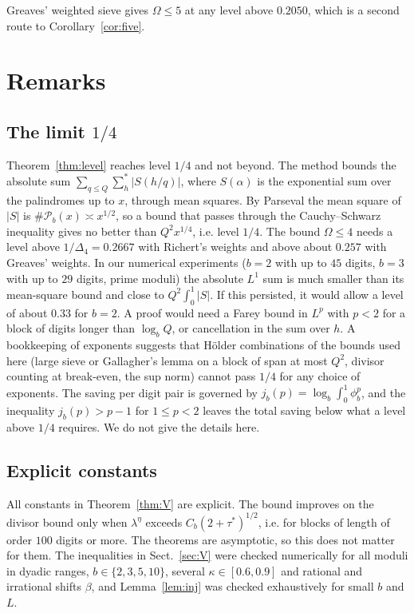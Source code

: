 \documentclass[11pt]{amsart}
\theoremstyle{definition}
\numberwithin{equation}{section}
\newcommand{\PP}{\mathscr{P}}
\begin{document}
Greaves' weighted sieve \cite{Gr82} gives $\Omega\le5$ at any level above $0.2050$, which is a second route to Corollary~\ref{cor:five}.

\section{Remarks}\label{sec:remarks}

\subsection{The limit $1/4$}
Theorem~\ref{thm:level} reaches level $1/4$ and not beyond. The method bounds the absolute sum $\sum_{q\le Q}\sum^*_h|S(h/q)|$, where $S(\alpha)$ is the exponential sum over the palindromes up to $x$, through mean squares. By Parseval the mean square of $|S|$ is $\#\PP_b(x)\asymp x^{1/2}$, so a bound that passes through the Cauchy--Schwarz inequality gives no better than $Q^2x^{1/4}$, i.e. level $1/4$. The bound $\Omega\le4$ needs a level above $1/\Delta_4=0.2667$ with Richert's weights and above about $0.257$ with Greaves' weights. In our numerical experiments ($b=2$ with up to $45$ digits, $b=3$ with up to $29$ digits, prime moduli) the absolute $L^1$ sum is much smaller than its mean-square bound and close to $Q^2\int_0^1|S|$. If this persisted, it would allow a level of about $0.33$ for $b=2$. A proof would need a Farey bound in $L^p$ with $p<2$ for a block of digits longer than $\log_bQ$, or cancellation in the sum over $h$. A bookkeeping of exponents suggests that H\"older combinations of the bounds used here (large sieve or Gallagher's lemma on a block of span at most $Q^2$, divisor counting at break-even, the sup norm) cannot pass $1/4$ for any choice of exponents. The saving per digit pair is governed by $j_b(p)=\log_b\int_0^1\phi_b^p$, and the inequality $j_b(p)>p-1$ for $1\le p<2$ leaves the total saving below what a level above $1/4$ requires. We do not give the details here.

\subsection{Explicit constants}
All constants in Theorem~\ref{thm:V} are explicit. The bound improves on the divisor bound only when $\lambda^{\eta}$ exceeds $C_b(2+\tau^*)^{1/2}$, i.e. for blocks of length of order $100$ digits or more. The theorems are asymptotic, so this does not matter for them. The inequalities in Sect.~\ref{sec:V} were checked numerically for all moduli in dyadic ranges, $b\in\{2,3,5,10\}$, several $\kappa\in[0.6,0.9]$ and rational and irrational shifts $\beta$, and Lemma~\ref{lem:inj} was checked exhaustively for small $b$ and $L$.
\end{document}
